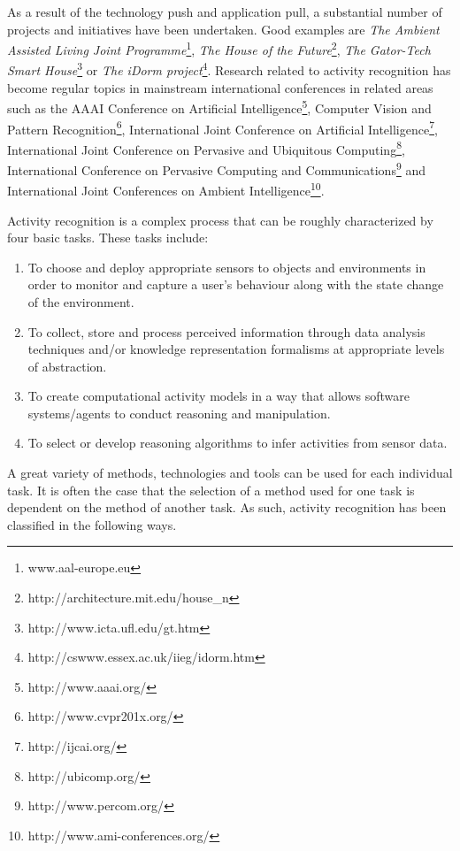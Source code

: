 As a result of the technology push and application pull, a substantial number of projects and initiatives have been undertaken. Good examples are \textit{The Ambient Assisted Living Joint Programme}\footnote{www.aal-europe.eu}, \textit{The House of the Future}\footnote{http://architecture.mit.edu/house\_n}, \textit{The Gator-Tech Smart House}\footnote{http://www.icta.ufl.edu/gt.htm} or \textit{The iDorm project}\footnote{http://cswww.essex.ac.uk/iieg/idorm.htm}. Research related to activity recognition has become regular topics in mainstream international conferences in related areas such as the AAAI Conference on Artificial Intelligence\footnote{http://www.aaai.org/}, Computer Vision and Pattern Recognition\footnote{http://www.cvpr201x.org/}, International Joint Conference on Artificial Intelligence\footnote{http://ijcai.org/}, International Joint Conference on Pervasive and Ubiquitous Computing\footnote{http://ubicomp.org/}, International Conference on Pervasive Computing and Communications\footnote{http://www.percom.org/} and International Joint Conferences on Ambient Intelligence\footnote{http://www.ami-conferences.org/}. %

Activity recognition is a complex process that can be roughly characterized by four basic tasks. These tasks include:
\begin{enumerate}
 \item To choose and deploy appropriate sensors to objects and environments in order to monitor and capture a user’s behaviour along with the state change of the environment.
 \item To collect, store and process perceived information through data analysis techniques and/or knowledge representation formalisms at appropriate levels of abstraction.
 \item To create computational activity models in a way that allows software systems/agents to conduct reasoning and manipulation.
 \item To select or develop reasoning algorithms to infer activities from sensor data.
\end{enumerate}

A great variety of methods, technologies and tools can be used for each individual task. It is often the case that the selection of a method used for one task is dependent on the method of another task. As such, activity recognition has been classified in the following ways.

